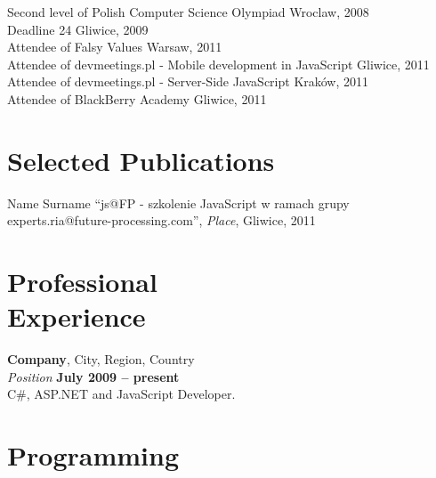 \documentclass[margin,line]{resume}
\begin{document}
\begin{resume}
    Second level of Polish Computer Science Olympiad Wroclaw, 2008                                  \vspace{1mm}\\%
    Deadline 24 Gliwice, 2009                                                                       \vspace{1mm}\\%
    Attendee of Falsy Values Warsaw, 2011                                                           \vspace{1mm}\\%
    Attendee of devmeetings.pl - Mobile development in JavaScript Gliwice, 2011                     \vspace{1mm}\\%
    Attendee of devmeetings.pl - Server-Side JavaScript Kraków, 2011                                \vspace{1mm}\\%
    Attendee of BlackBerry Academy Gliwice, 2011                                                    \vspace{1mm}\\%

    \section{\mysidestyle Selected Publications}

    Name Surname
    ``js@FP - szkolenie JavaScript w ramach grupy experts.ria@future-processing.com'',
    \textsl{Place}, Gliwice, 2011

    \section{\mysidestyle Professional\\Experience}

    \textbf{Company}, City, Region, Country \vspace{2mm}\\\vspace{1mm}%
    \textsl{Position} \hfill \textbf{July 2009 -- present}\\
    C\#, ASP.NET and JavaScript Developer.

    \section{\mysidestyle Programming} 


\end{resume}
\end{document}
